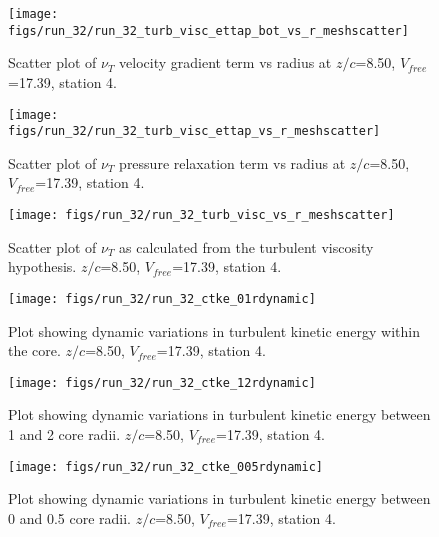 \begin{figure}[H]
\centering
\texttt{[image: figs/run\_32/run\_32\_turb\_visc\_ettap\_bot\_vs\_r\_meshscatter]}
\caption{Scatter plot of $\nu_T$ velocity gradient term vs radius at $z/c$=8.50, $V_{free}$=17.39, station 4.}
\end{figure}


\begin{figure}[H]
\centering
\texttt{[image: figs/run\_32/run\_32\_turb\_visc\_ettap\_vs\_r\_meshscatter]}
\caption{Scatter plot of $\nu_T$ pressure relaxation term vs radius at $z/c$=8.50, $V_{free}$=17.39, station 4.}
\end{figure}


\begin{figure}[H]
\centering
\texttt{[image: figs/run\_32/run\_32\_turb\_visc\_vs\_r\_meshscatter]}
\caption{Scatter plot of $\nu_T$ as calculated from the turbulent viscosity hypothesis. $z/c$=8.50, $V_{free}$=17.39, station 4.}
\end{figure}


\begin{figure}[H]
\centering
\texttt{[image: figs/run\_32/run\_32\_ctke\_01rdynamic]}
\caption{Plot showing dynamic variations in turbulent kinetic energy within the core. $z/c$=8.50, $V_{free}$=17.39, station 4.}
\end{figure}


\begin{figure}[H]
\centering
\texttt{[image: figs/run\_32/run\_32\_ctke\_12rdynamic]}
\caption{Plot showing dynamic variations in turbulent kinetic energy between 1 and 2 core radii. $z/c$=8.50, $V_{free}$=17.39, station 4.}
\end{figure}


\begin{figure}[H]
\centering
\texttt{[image: figs/run\_32/run\_32\_ctke\_005rdynamic]}
\caption{Plot showing dynamic variations in turbulent kinetic energy between 0 and 0.5 core radii. $z/c$=8.50, $V_{free}$=17.39, station 4.}
\end{figure}


